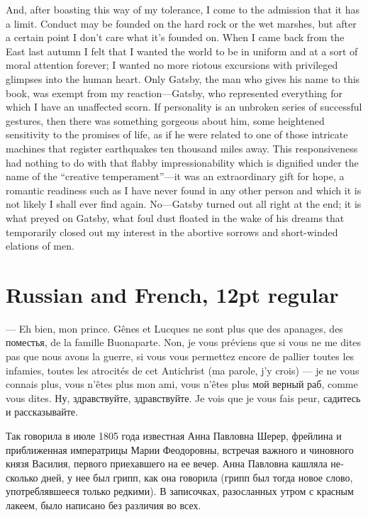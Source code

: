\documentclass[12pt]{book}
\newcommand{\cyrillicfont}{\stdfont}
\newcommand{\russ}[1]{\textrussian{\cyrillicfont#1}}
\begin{document}
And, after boasting this way of my tolerance, I come to the admission
that it has a limit. Conduct may be founded on the hard rock or the
wet marshes, but after a certain point I don’t care what it’s founded
on. When I came back from the East last autumn I felt that I wanted
the world to be in uniform and at a sort of moral attention forever; I
wanted no more riotous excursions with privileged glimpses into the
human heart. Only Gatsby, the man who gives his name to this book, was
exempt from my reaction—Gatsby, who represented everything for which I
have an unaffected scorn. If personality is an unbroken series of
successful gestures, then there was something gorgeous about him, some
heightened sensitivity to the promises of life, as if he were related
to one of those intricate machines that register earthquakes ten
thousand miles away. This responsiveness had nothing to do with that
flabby impressionability which is dignified under the name of the
“creative temperament”—it was an extraordinary gift for hope, a
romantic readiness such as I have never found in any other person and
which it is not likely I shall ever find again. No—Gatsby turned out
all right at the end; it is what preyed on Gatsby, what foul dust
floated in the wake of his dreams that temporarily closed out my
interest in the abortive sorrows and short-winded elations of men.

\section*{Russian and French, 12pt regular}

\noindent\textfrench{— Eh bien, mon prince. Gênes et Lucques ne sont plus que des apanages,
des поместья, de la famille Buonaparte. Non, je vous préviens que si
vous ne me dites pas que nous avons la guerre, si vous vous permettez
encore de pallier toutes les infamies, toutes les atrocités de cet
Antichrist (ma parole, j'y crois) — je ne vous connais plus, vous
n'êtes plus mon ami, vous n'êtes plus} \russ{мой верный раб, comme vous
dites. Ну, здравствуйте, здравствуйте. Je vois que je vous fais
peur, садитесь и рассказывайте.}

\russ{Так говорила в июле 1805 года известная Анна Павловна Шерер, фрейлина
и приближенная императрицы Марии Феодоровны, встречая важного и
чиновного князя Василия, первого приехавшего на ее вечер. Анна
Павловна кашляла несколько дней, у нее был грипп, как она говорила
(грипп был тогда новое слово, употреблявшееся только редкими). В
записочках, разосланных утром с красным лакеем, было написано без
различия во всех.}
\end{document}
